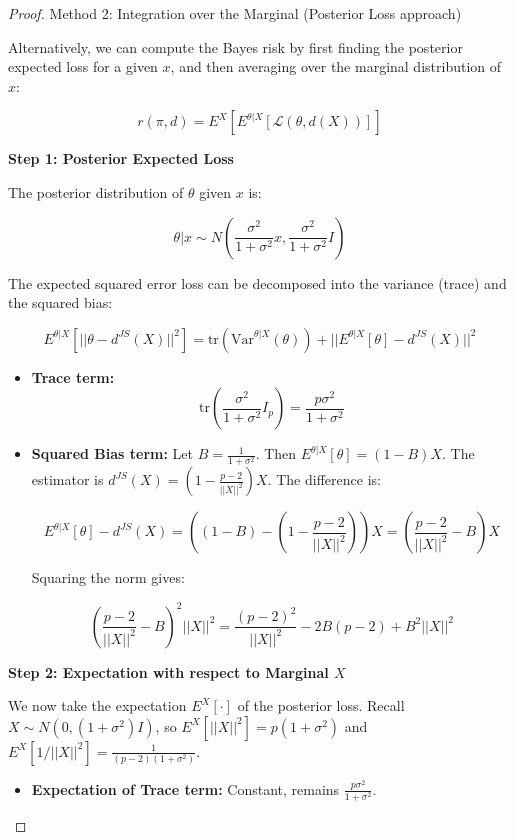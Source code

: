 \documentclass[
  letterpaper,
  DIV=11,
  numbers=noendperiod]{scrreprt}
\providecommand{\tightlist}{%
  \setlength{\itemsep}{0pt}\setlength{\parskip}{0pt}}
\renewcommand{\[}{\begin{equation}}
\renewcommand{\]}{\end{equation}}
\theoremstyle{definition}
\theoremstyle{plain}
\theoremstyle{plain}
\theoremstyle{plain}
\theoremstyle{definition}
\theoremstyle{plain}
\theoremstyle{remark}
\begin{document}
\begin{proof}
\leavevmode

Method 2: Integration over the Marginal (Posterior Loss approach)

Alternatively, we can compute the Bayes risk by first finding the
posterior expected loss for a given \(x\), and then averaging over the
marginal distribution of \(x\):

\[
r(\pi, d) = E^X [ E^{\theta|X} [ \mathcal{L}(\theta, d(X)) ] ]
\]

\textbf{Step 1: Posterior Expected Loss}

The posterior distribution of \(\theta\) given \(x\) is:

\[
\theta | x \sim N \left( \frac{\sigma^2}{1+\sigma^2}x, \frac{\sigma^2}{1+\sigma^2}I \right)
\]

The expected squared error loss can be decomposed into the variance
(trace) and the squared bias:

\[
E^{\theta|X} [ ||\theta - d^{JS}(X)||^2 ] = \text{tr}(\text{Var}^{\theta|X}(\theta)) + || E^{\theta|X}[\theta] - d^{JS}(X) ||^2
\]

\begin{itemize}
\item
  \textbf{Trace term:}
  \[\text{tr} \left( \frac{\sigma^2}{1+\sigma^2} I_p \right) = \frac{p\sigma^2}{1+\sigma^2}\]
\item
  \textbf{Squared Bias term:} Let \(B = \frac{1}{1+\sigma^2}\). Then
  \(E^{\theta|X}[\theta] = (1-B)X\). The estimator is
  \(d^{JS}(X) = (1 - \frac{p-2}{||X||^2})X\). The difference is:

  \[
  E^{\theta|X}[\theta] - d^{JS}(X) = \left( (1-B) - \left( 1 - \frac{p-2}{||X||^2} \right) \right) X = \left( \frac{p-2}{||X||^2} - B \right) X
  \]

  Squaring the norm gives:

  \[
  \left( \frac{p-2}{||X||^2} - B \right)^2 ||X||^2 = \frac{(p-2)^2}{||X||^2} - 2B(p-2) + B^2 ||X||^2
  \]
\end{itemize}

\textbf{Step 2: Expectation with respect to Marginal \(X\)}

We now take the expectation \(E^X[\cdot]\) of the posterior loss. Recall
\(X \sim N(0, (1+\sigma^2)I)\), so \(E^X[||X||^2] = p(1+\sigma^2)\) and
\(E^X[1/||X||^2] = \frac{1}{(p-2)(1+\sigma^2)}\).

\begin{itemize}
\tightlist
\item
  \textbf{Expectation of Trace term:} Constant, remains
  \(\frac{p\sigma^2}{1+\sigma^2}\).


\end{itemize}
\end{proof}
\end{document}

